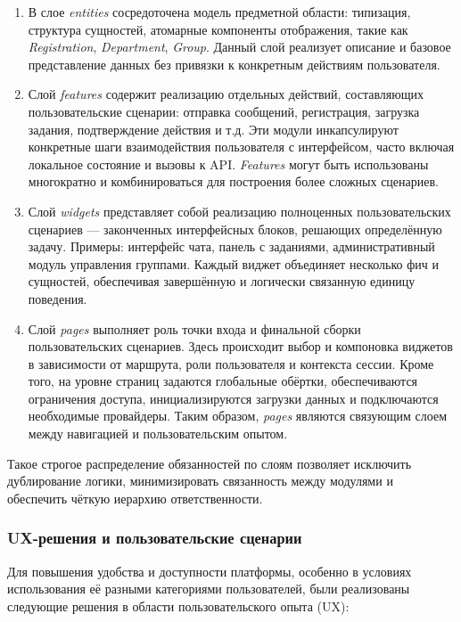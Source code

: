 \begin{enumerate}
  	\item В слое \textit{entities} сосредоточена модель предметной области: типизация, структура сущностей, атомарные компоненты отображения, такие как \textit{Registration}, \textit{Department}, \textit{Group}. Данный слой реализует описание и базовое представление данных без привязки к конкретным действиям пользователя.
	\item Слой \textit{features} содержит реализацию отдельных действий, составляющих пользовательские сценарии: отправка сообщений, регистрация, загрузка задания, подтверждение действия и т.д. Эти модули инкапсулируют конкретные шаги взаимодействия пользователя с интерфейсом, часто включая локальное состояние и вызовы к API. \textit{Features} могут быть использованы многократно и комбинироваться для построения более сложных сценариев.
	\item Слой \textit{widgets} представляет собой реализацию полноценных пользовательских сценариев — законченных интерфейсных блоков, решающих определённую задачу. Примеры: интерфейс чата, панель с заданиями, административный модуль управления группами. Каждый виджет объединяет несколько фич и сущностей, обеспечивая завершённую и логически связанную единицу поведения.
	\item Слой \textit{pages} выполняет роль точки входа и финальной сборки пользовательских сценариев. Здесь происходит выбор и компоновка виджетов в зависимости от маршрута, роли пользователя и контекста сессии. Кроме того, на уровне страниц задаются глобальные обёртки, обеспечиваются ограничения доступа, инициализируются загрузки данных и подключаются необходимые провайдеры. Таким образом, \textit{pages} являются связующим слоем между навигацией и пользовательским опытом.
\end{enumerate}

Такое строгое распределение обязанностей по слоям позволяет исключить дублирование логики, минимизировать связанность между модулями и обеспечить чёткую иерархию ответственности.

\subsubsection{UX-решения и пользовательские сценарии}

Для повышения удобства и доступности платформы, особенно в условиях использования её разными категориями пользователей, были реализованы следующие решения в области пользовательского опыта (UX):

